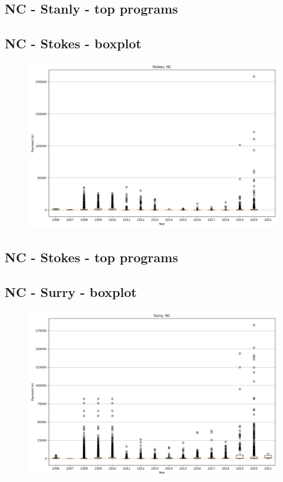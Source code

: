 \subsection*{NC - Stanly - top programs}

\newpage
\subsection*{NC - Stokes - boxplot}
\begin{figure}[h]
\centering
\includegraphics[width=7in]{../output/boxplots/counties/Stokes-NC_boxplot.png}
\end{figure}


\subsection*{NC - Stokes - top programs}

\newpage
\subsection*{NC - Surry - boxplot}
\begin{figure}[h]
\centering
\includegraphics[width=7in]{../output/boxplots/counties/Surry-NC_boxplot.png}
\end{figure}


